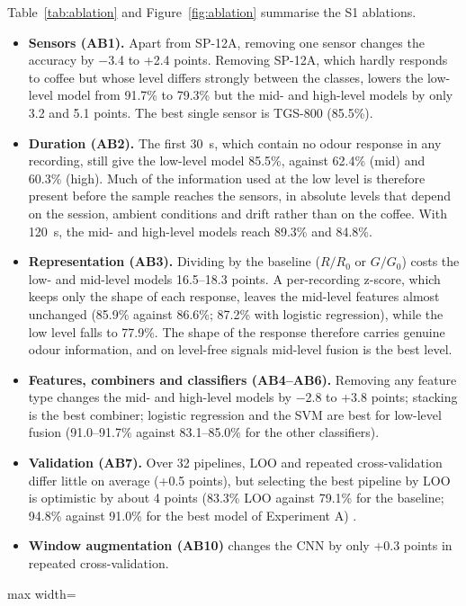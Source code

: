 Table~\ref{tab:ablation} and Figure~\ref{fig:ablation} summarise the S1 ablations.
\begin{itemize}
\item \textbf{Sensors (AB1).} Apart from SP-12A, removing one sensor changes the accuracy by $-$3.4 to +2.4 points. Removing SP-12A, which hardly responds to coffee but whose level differs strongly between the classes, lowers the low-level model from 91.7\% to 79.3\% but the mid- and high-level models by only 3.2 and 5.1 points. The best single sensor is TGS-800 (85.5\%).
\item \textbf{Duration (AB2).} The first 30~s, which contain no odour response in any recording, still give the low-level model 85.5\%, against 62.4\% (mid) and 60.3\% (high). Much of the information used at the low level is therefore present before the sample reaches the sensors, in absolute levels that depend on the session, ambient conditions and drift \cite{vergara2012chemical} rather than on the coffee. With 120~s, the mid- and high-level models reach 89.3\% and 84.8\%.
\item \textbf{Representation (AB3).} Dividing by the baseline ($R/R_0$ or $G/G_0$) costs the low- and mid-level models 16.5--18.3 points. A per-recording z-score, which keeps only the shape of each response, leaves the mid-level features almost unchanged (85.9\% against 86.6\%; 87.2\% with logistic regression), while the low level falls to 77.9\%. The shape of the response therefore carries genuine odour information, and on level-free signals mid-level fusion is the best level.
\item \textbf{Features, combiners and classifiers (AB4--AB6).} Removing any feature type changes the mid- and high-level models by $-$2.8 to +3.8 points; stacking is the best combiner; logistic regression and the SVM are best for low-level fusion (91.0--91.7\% against 83.1--85.0\% for the other classifiers).
\item \textbf{Validation (AB7).} Over 32 pipelines, LOO and repeated cross-validation differ little on average (+0.5 points), but selecting the best pipeline by LOO is optimistic by about 4 points (83.3\% LOO against 79.1\% for the baseline; 94.8\% against 91.0\% for the best model of Experiment A) \cite{varma2006bias,cawley2010overfitting}.
\item \textbf{Window augmentation (AB10)} changes the CNN by only +0.3 points in repeated cross-validation.
\end{itemize}

\begin{table}[!htbp]
\centering
\caption[S1 ablations: accuracy of the reference model of each level]{S1 ablations: accuracy (\%) of the reference model of each fusion level (five repeats of five-fold cross-validation).}
\label{tab:ablation}
\footnotesize
\begin{adjustbox}{max width=\textwidth}

\end{adjustbox}
\end{table}

